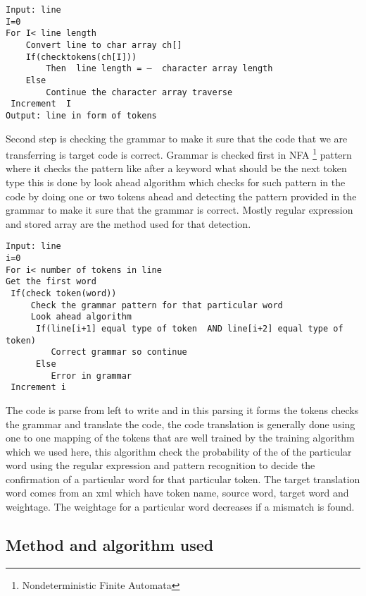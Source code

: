 \documentclass[23pt]{article}
\begin{document}
\begin{lstlisting}[label=some-code,caption= Algorithm Lexical analysis]
 Input: line 
I=0
For I< line length
    Convert line to char array ch[]
    If(checktokens(ch[I]))
        Then  line length = –  character array length
    Else 
        Continue the character array traverse
 Increment  I
Output: line in form of tokens

\end{lstlisting}

{\Large Second step is checking the grammar to make it sure that the code that we are transferring is target code is correct. Grammar is checked first in NFA \footnote{Nondeterministic Finite Automata }   pattern where it checks the pattern like after a keyword what should be the next token type this is done by look ahead algorithm which checks for such pattern in the code by doing one or two tokens ahead and detecting the pattern provided in the grammar to make it sure that the grammar is correct. Mostly regular expression and stored array are the method used for that detection. \\ \par}

\begin{lstlisting}[label=some-code,caption= Algorithm for grammar check]
Input: line
i=0
For i< number of tokens in line
Get the first word
 If(check token(word))
     Check the grammar pattern for that particular word
     Look ahead algorithm
      If(line[i+1] equal type of token  AND line[i+2] equal type of token)
         Correct grammar so continue
      Else
         Error in grammar
 Increment i

\end{lstlisting}

{\Large The code is parse from left to write and in this parsing it forms the tokens checks the grammar and translate the code, the code translation is generally done using one to one mapping of the tokens that are well trained by the training algorithm which we used here, this algorithm check the probability of the of the particular word using the regular expression and pattern recognition to decide the confirmation of a particular word for that particular token. The target translation word comes from an xml which have token name, source word, target word and weightage. The weightage for a particular word decreases if a mismatch is found. \\ \par}

\subsection{Method and algorithm used }
\end{document}
